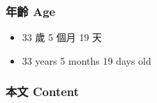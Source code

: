 \documentclass[a5paper, 12pt
]{book}
\providecommand{\tightlist}{%
  \setlength{\itemsep}{0pt}\setlength{\parskip}{0pt}}
\begin{document}
\hypertarget{ux5e74ux9f61-age-12}{%
\subsubsection{年齡 Age}\label{ux5e74ux9f61-age-12}}

\begin{itemize}
\tightlist
\item
  33 歲 5 個月 19 天
\item
  33 years 5 months 19 days old
\end{itemize}

\hypertarget{ux672cux6587-content-12}{%
\subsubsection{本文 Content}\label{ux672cux6587-content-12}}
\end{document}
